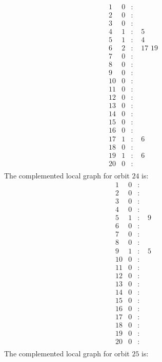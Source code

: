 \documentclass[12pt]{article}
\begin{document}
\begin{equation*}
\begin{array}{rrcl}
1&0&:&\\
2&0&:&\\
3&0&:&\\
4&1&:&\,\,5\\
5&1&:&\,\,4\\
6&2&:&\,\,17\,\,19\\
7&0&:&\\
8&0&:&\\
9&0&:&\\
10&0&:&\\
11&0&:&\\
12&0&:&\\
13&0&:&\\
14&0&:&\\
15&0&:&\\
16&0&:&\\
17&1&:&\,\,6\\
18&0&:&\\
19&1&:&\,\,6\\
20&0&:&\\
\end{array}
\end{equation*}
The complemented local graph for orbit $24$ is:
\begin{equation*}
\begin{array}{rrcl}
1&0&:&\\
2&0&:&\\
3&0&:&\\
4&0&:&\\
5&1&:&\,\,9\\
6&0&:&\\
7&0&:&\\
8&0&:&\\
9&1&:&\,\,5\\
10&0&:&\\
11&0&:&\\
12&0&:&\\
13&0&:&\\
14&0&:&\\
15&0&:&\\
16&0&:&\\
17&0&:&\\
18&0&:&\\
19&0&:&\\
20&0&:&\\
\end{array}
\end{equation*}
The complemented local graph for orbit $25$ is:
\end{document}
